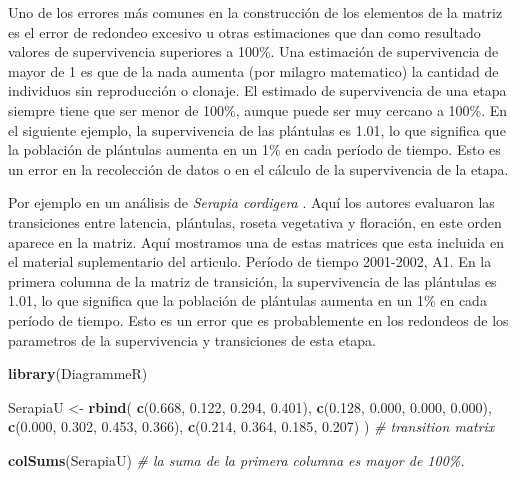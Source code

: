 \documentclass[
]{book}
\newenvironment{Shaded}{\begin{snugshade}}{\end{snugshade}}
\newcommand{\CommentTok}[1]{\textcolor[rgb]{0.56,0.35,0.01}{\textit{#1}}}
\newcommand{\FloatTok}[1]{\textcolor[rgb]{0.00,0.00,0.81}{#1}}
\newcommand{\FunctionTok}[1]{\textcolor[rgb]{0.13,0.29,0.53}{\textbf{#1}}}
\newcommand{\NormalTok}[1]{#1}
\newcommand{\OtherTok}[1]{\textcolor[rgb]{0.56,0.35,0.01}{#1}}
\theoremstyle{definition}
\theoremstyle{definition}
\theoremstyle{definition}
\theoremstyle{definition}
\theoremstyle{remark}
\begin{document}
Uno de los errores más comunes en la construcción de los elementos de la matriz es el error de redondeo excesivo u otras estimaciones que dan como resultado valores de supervivencia superiores a 100\%. Una estimación de supervivencia de mayor de 1 es que de la nada aumenta (por milagro matematico) la cantidad de individuos sin reproducción o clonaje. El estimado de supervivencia de una etapa siempre tiene que ser menor de 100\%, aunque puede ser muy cercano a 100\%. En el siguiente ejemplo, la supervivencia de las plántulas es 1.01, lo que significa que la población de plántulas aumenta en un 1\% en cada período de tiempo. Esto es un error en la recolección de datos o en el cálculo de la supervivencia de la etapa.

Por ejemplo en un análisis de \emph{Serapia cordigera} \citep{pellegrino2014effects}. Aquí los autores evaluaron las transiciones entre latencia, plántulas, roseta vegetativa y floración, en este orden aparece en la matriz. Aquí mostramos una de estas matrices que esta incluida en el material suplementario del articulo. Período de tiempo 2001-2002, A1. En la primera columna de la matriz de transición, la supervivencia de las plántulas es 1.01, lo que significa que la población de plántulas aumenta en un 1\% en cada período de tiempo. Esto es un error que es probablemente en los redondeos de los parametros de la supervivencia y transiciones de esta etapa.

\begin{Shaded}
\begin{Highlighting}[]
\FunctionTok{library}\NormalTok{(DiagrammeR)}

\NormalTok{SerapiaU }\OtherTok{\textless{}{-}} \FunctionTok{rbind}\NormalTok{(}
  \FunctionTok{c}\NormalTok{(}\FloatTok{0.668}\NormalTok{, }\FloatTok{0.122}\NormalTok{, }\FloatTok{0.294}\NormalTok{, }\FloatTok{0.401}\NormalTok{),}
  \FunctionTok{c}\NormalTok{(}\FloatTok{0.128}\NormalTok{, }\FloatTok{0.000}\NormalTok{, }\FloatTok{0.000}\NormalTok{, }\FloatTok{0.000}\NormalTok{),}
  \FunctionTok{c}\NormalTok{(}\FloatTok{0.000}\NormalTok{, }\FloatTok{0.302}\NormalTok{, }\FloatTok{0.453}\NormalTok{, }\FloatTok{0.366}\NormalTok{),}
  \FunctionTok{c}\NormalTok{(}\FloatTok{0.214}\NormalTok{, }\FloatTok{0.364}\NormalTok{, }\FloatTok{0.185}\NormalTok{, }\FloatTok{0.207}\NormalTok{)}
\NormalTok{) }\CommentTok{\# transition matrix}

\FunctionTok{colSums}\NormalTok{(SerapiaU) }\CommentTok{\# la suma de la primera columna es mayor de 100\%. }
\end{Highlighting}
\end{Shaded}
\end{document}
